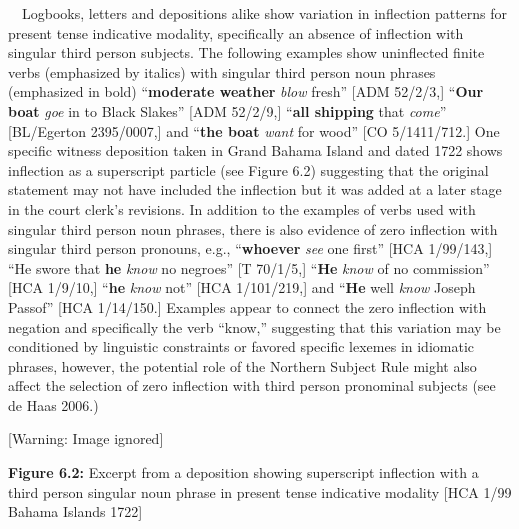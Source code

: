\begin{styleStandard}
\ \ Logbooks, letters and depositions alike show variation in inflection patterns for present tense indicative modality, specifically an absence of inflection with singular third person subjects. The following examples show uninflected finite verbs (emphasized by italics) with singular third person noun phrases (emphasized in bold) “\textbf{moderate weather} \textit{blow} fresh” [ADM 52/2/3,] “\textbf{Our boat} \textit{goe }in to Black Slakes” [ADM 52/2/9,] “\textbf{all shipping }that \textit{come}” [BL/Egerton 2395/0007,] and “\textbf{the boat} \textit{want }for wood” [CO 5/1411/712.] One specific witness deposition taken in Grand Bahama Island and dated 1722 shows inflection as a superscript particle (see Figure 6.2) suggesting that the original statement may not have included the inflection but it was added at a later stage in the court clerk’s revisions. In addition to the examples of verbs used with singular third person noun phrases, there is also evidence of zero inflection with singular third person pronouns, e.g., “\textbf{whoever}\textit{ see} one first” [HCA 1/99/143,] “He swore that \textbf{he} \textit{know} no negroes” [T 70/1/5,] “\textbf{He} \textit{know} of no commission” [HCA 1/9/10,] “\textbf{he} \textit{know} not” [HCA 1/101/219,] and “\textbf{He} well \textit{know }Joseph Passof” [HCA 1/14/150.] Examples appear to connect the zero inflection with negation and specifically the verb “know,” suggesting that this variation may be conditioned by linguistic constraints or favored specific lexemes in idiomatic phrases, however, the potential role of the Northern Subject Rule might also affect the selection of zero inflection with third person pronominal subjects (see de Haas 2006.) 
\end{styleStandard}

\begin{center}
 [Warning: Image ignored] %

\end{center}
\begin{styleStandard}
\textbf{Figure 6.2: }Excerpt from a deposition showing superscript inflection with a third person singular noun phrase in present tense indicative modality [HCA 1/99 Bahama Islands 1722]
\end{styleStandard}

